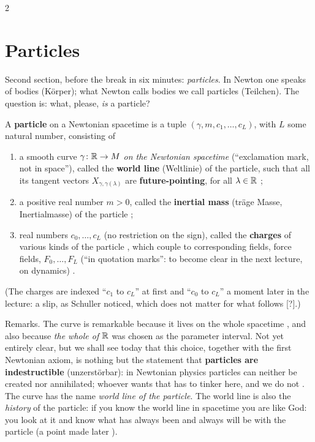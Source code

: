 \begin{paracol}{2}
\section{Particles}\label{sec:nk-particles}

Second section, before the break in six minutes: \emph{particles}. In Newton one speaks of bodies (K\"orper); what Newton calls bodies we call particles (Teilchen). The question is: what, please, \emph{is} a particle?
\begin{definition}\label{def:nk-particle}
A \textbf{particle} on a Newtonian spacetime is a tuple $(\gamma,m,c_1,\dots,c_L)$, with $L$ some natural number, consisting of
\begin{enumerate}
  \item a smooth curve $\gamma\colon\mathbb{R}\to M$ \emph{on the Newtonian spacetime} (``exclamation mark, not in space''), called the \textbf{world line} (Weltlinie) of the particle, such that
        all its tangent vectors $X_{\gamma,\gamma(\lambda)}$ are \textbf{future-pointing}, for all $\lambda\in\mathbb{R}$ ;
  \item a positive real number $m>0$, called the \textbf{inertial mass} (tr\"age Masse, Inertialmasse) of the particle ;
  \item real numbers $c_0,\dots,c_L$ (no restriction on the sign), called the \textbf{charges} of various kinds of the particle , which couple to corresponding fields, force fields, $F_0,\dots,F_L$
        (``in quotation marks'': to become clear in the next lecture, on dynamics) .
\end{enumerate}
\end{definition}
(The charges are indexed ``$c_1$ to $c_L$'' at first and ``$c_0$ to $c_L$'' a moment later in the lecture: a slip, as Schuller noticed, which does not matter for what follows [?].)

Remarks. The curve is remarkable because it lives on the whole spacetime , and also because \emph{the whole of $\mathbb{R}$} was chosen as the parameter interval. Not yet entirely clear, but we shall see today that this choice, together with the first
Newtonian axiom, is nothing but the statement that \textbf{particles are indestructible} (unzerst\"orbar): in Newtonian physics particles can neither be created nor annihilated; whoever wants that has to tinker here, and we do not
. The curve has the name \emph{world line of the particle}. The world line is also the \emph{history} of the particle: if you know the world line in spacetime you are like God: you
look at it and know what has always been and always will be with the particle (a point made later ).


\end{paracol}
